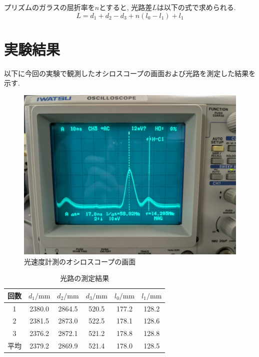 \documentclass{jarticle}
\begin{document}
プリズムのガラスの屈折率を$n$とすると, 光路差$L$は以下の式で求められる.
\begin{equation}
  \label{eq:L}
  L=d_1+d_2-d_3+n(l_0-l_1)+l_1
\end{equation}



\section{実験結果}



以下に今回の実験で観測したオシロスコープの画面および光路を測定した結果を示す.

\begin{figure}[H]
  \begin{center}
    \includegraphics[scale=0.3]{lightspeed_result_picture.jpg}
    \caption{光速度計測のオシロスコープの画面}
  \end{center}
\end{figure}

\begin{table}[h]
  \centering
  \caption{光路の測定結果}
  \begin{tabular}{cccccc}
    \hline
    回数 & $d_1/\mathrm{mm}$ & $d_2/\mathrm{mm}$ & $d_3/\mathrm{mm}$ & $l_0/\mathrm{mm}$ & $l_1/\mathrm{mm}$ \\
    \hline
    1 & 2380.0 & 2864.5 & 520.5 & 177.2 & 128.2 \\
    2 & 2381.5 & 2873.0 & 522.5 & 178.1 & 128.6 \\
    3 & 2376.2 & 2872.1 & 521.2 & 178.8 & 128.8 \\
    \hline
    平均 & 2379.2 & 2869.9 & 521.4 & 178.0 & 128.5 \\
    \hline
  \end{tabular}
\end{table}
\end{document}
